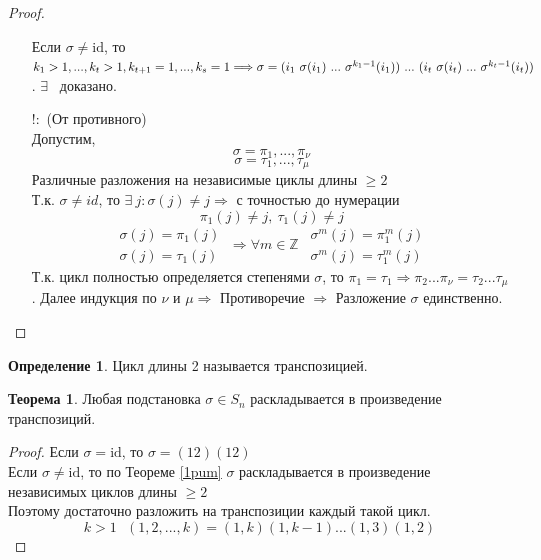 \documentclass[a4paper, 12pt]{article}
\newcommand{\Z}{\mathbb Z}
\theoremstyle{definition}
\newtheorem*{definition}{Определение}
\newtheorem*{theorem}{Теорема}
\begin{document}
\begin{proof}
\begin{itemize}
    Если $\sigma \neq \textrm{id}$, то $k_1>1,...,k_t>1,k_{t+1}=1,...,k_s=1 \Longrightarrow \\
    \sigma = (i_1 \ \sigma(i_1) \ ... \ \sigma^{k_1-1}(i_1)) \ ... \ (i_t \ \sigma(i_t) \ ... \ \sigma^{k_t-1}(i_t))$. $\exists$ \ доказано.   
    \item[ $!:$ ](От противного)\\
    Допустим, $$\sigma = \pi_1,...,\pi_{\nu}$$ $$\sigma = \tau_1,...,\tau_{\mu}$$  Различные разложения на независимые циклы длины $\geq 2$ \\
    Т.к. $\sigma \neq id$, то $\exists \ j: \sigma(j) \neq j \Longrightarrow $ с точностью до нумерации $$\pi_1(j) \neq j, \ \tau_1(j) \neq j$$  
    $$\begin{matrix}
      \sigma(j) = \pi_1(j) \\
      \sigma(j) = \tau_1(j)
    \end{matrix} \ \Longrightarrow \forall m \in \Z  \ \ \begin{matrix}
      \sigma^m(j) = \pi_1^m(j) \\
      \sigma^m(j) = \tau_1^m(j)
    \end{matrix}$$ 
    Т.к. цикл полностью определяется степенями $\sigma$, то $\pi_1 = \tau_1 \Longrightarrow \pi_2 ... \pi_{\nu} = \tau_2 ... \tau_{\mu}$. Далее индукция по $\nu$ и $\mu \Longrightarrow $ Противоречие $\Longrightarrow $ Разложение $\sigma$ единственно.   
    \end{itemize}
  \end{proof} 
  \begin{definition}
    Цикл длины 2 называется транспозицией. 
  \end{definition}
  \begin{theorem}
    Любая подстановка $\sigma \in S_n$ раскладывается в произведение транспозиций. 
  \end{theorem} 
  \begin{proof}
    Если $\sigma = \textrm{id}$, то $\sigma = (12)(12)$ \\
    Если $\sigma \neq \textrm{id}$, то по Теореме \eqref{1pum} $\sigma$ раскладывается в произведение независимых циклов длины $\geq 2$ \\
    Поэтому достаточно разложить на транспозиции каждый такой цикл.
    $$k>1 \ \ \ (1,2,...,k) = (1,k)(1,k-1)...(1,3)(1,2)$$     
  \end{proof} 
\end{document}
